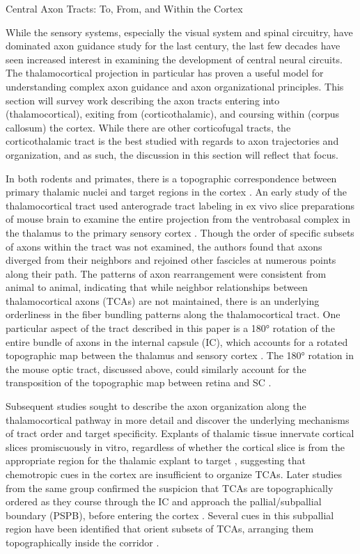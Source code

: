 Central Axon Tracts: To, From, and Within the Cortex

While the sensory systems, especially the visual system and spinal circuitry, have dominated axon guidance study for the last century, the last few decades have seen increased interest in examining the development of central neural circuits. 
The thalamocortical projection in particular has proven a useful model for understanding complex axon guidance and axon organizational principles. 
This section will survey work describing the axon tracts entering into (thalamocortical), exiting from (corticothalamic), and coursing within (corpus callosum) the cortex. 
While there are other corticofugal tracts, the corticothalamic tract is the best studied with regards to axon trajectories and organization, and as such, the discussion in this section will reflect that focus. 

In both rodents and primates, there is a topographic correspondence between primary thalamic nuclei and target regions in the cortex \cite{caviness1980tangential,hohl1991topographical}. 
An early study of the thalamocortical tract used anterograde tract labeling in ex vivo slice preparations of mouse brain to examine the entire projection from the ventrobasal complex in the thalamus to the primary sensory cortex \cite{bernardo1987axonal}. 
Though the order of specific subsets of axons within the tract was not examined, the authors found that axons diverged from their neighbors and rejoined other fascicles at numerous points along their path. 
The patterns of axon rearrangement were consistent from animal to animal, indicating that while neighbor relationships between thalamocortical axons (TCAs) are not maintained, there is an underlying orderliness in the fiber bundling patterns along the thalamocortical tract. 
One particular aspect of the tract described in this paper is a 180° rotation of the entire bundle of axons in the internal capsule (IC), which accounts for a rotated topographic map between the thalamus and sensory cortex \cite{bernardo1987axonal}. 
The 180° rotation in the mouse optic tract, discussed above, could similarly account for the transposition of the topographic map between retina and SC \cite{plas2005pretarget}. 

Subsequent studies sought to describe the axon organization along the thalamocortical pathway in more detail and discover the underlying mechanisms of tract order and target specificity. 
Explants of thalamic tissue innervate cortical slices promiscuously in vitro, regardless of whether the cortical slice is from the appropriate region for the thalamic explant to target \cite{molnar1991lack}, suggesting that chemotropic cues in the cortex are insufficient to organize TCAs. 
Later studies from the same group confirmed the suspicion that TCAs are topographically ordered as they course through the IC and approach the pallial/subpallial boundary (PSPB), before entering the cortex \cite{molnar1998mechanisms}. 
Several cues in this subpallial region have been identified that orient subsets of TCAs, arranging them topographically inside the corridor \cite{dufour2003area,powell2008topography,seibt2003neurogenin2}. 

